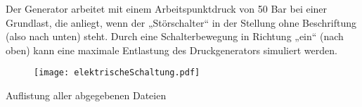 \documentclass[11pt, a4paper,parskip=half]{article}
\begin{document}
Der Generator arbeitet mit einem Arbeitspunktdruck von 50 Bar bei einer Grundlast, die anliegt, wenn der „Störschalter“ in der Stellung ohne Beschriftung (also nach unten) steht. Durch eine Schalterbewegung in Richtung „ein“ (nach oben) kann eine maximale Entlastung des Druckgenerators simuliert werden.


\begin{figure}[htbp]
	\begin{center}
		\texttt{[image: elektrischeSchaltung.pdf]} 
	\end{center} 
\end{figure}


\newpage
\begin{huge}
Auflistung aller abgegebenen Dateien\\

\end{huge}
\end{document}
